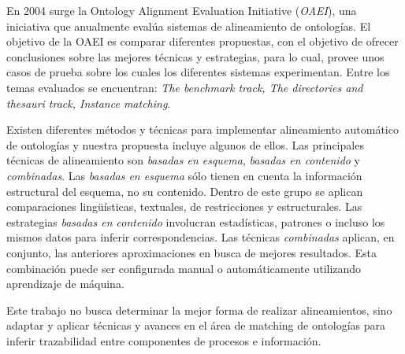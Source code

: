 En 2004 surge la Ontology Alignment Evaluation Initiative (\textit{OAEI}), una iniciativa que anualmente eval\'ua sistemas de alineamiento de ontolog\'ias. El objetivo de la OAEI es comparar diferentes propuestas, con el objetivo de ofrecer conclusiones sobre las mejores t\'ecnicas y estrategias, para lo cual, provee unos casos de prueba sobre los cuales los diferentes sistemas experimentan.  Entre los temas evaluados se encuentran: \textit{The benchmark track, The directories and thesauri track, Instance matching}. 

Existen diferentes m\'etodos y t\'ecnicas para implementar alineamiento autom\'atico de ontolog\'ias \cite{Madhavan:2001, Rahm:2001, Shvaiko:2005} y nuestra propuesta incluye algunos de ellos. Las principales t\'ecnicas de alineamiento son \textit{basadas en esquema}, \textit{basadas en contenido} y \textit{combinadas}. Las \textit{basadas en esquema} s\'olo tienen en cuenta la informaci\'on estructural del esquema, no su contenido. Dentro de este grupo se aplican comparaciones ling\"u\'isticas, textuales, de restricciones y estructurales. Las estrategias \textit{basadas en contenido} involucran estad\'isticas, patrones o incluso los mismos datos para inferir correspondencias. Las t\'ecnicas \textit{combinadas} aplican, en conjunto, las anteriores aproximaciones en busca de mejores resultados. Esta combinaci\'on puede ser configurada manual o autom\'aticamente utilizando aprendizaje de m\'aquina. 

Este trabajo no busca determinar la mejor forma de realizar alineamientos, sino adaptar y aplicar t\'ecnicas y avances en el \'area de matching de ontolog\'ias para inferir trazabilidad entre componentes de procesos e informaci\'on.
